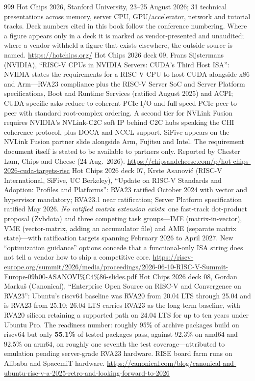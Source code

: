 \begin{thebibliography}{999}
 Hot Chips 2026, Stanford University, 23--25 August 2026; 31 technical presentations across memory, server CPU, GPU/accelerator, network and tutorial tracks. Deck numbers cited in this book follow the conference numbering. Where a figure appears only in a deck it is marked as vendor-presented and unaudited; where a vendor withheld a figure that exists elsewhere, the outside source is named. \url{https://hotchips.org/}
 Hot Chips 2026 deck 09, Frans Sijstermans (NVIDIA), ``RISC-V CPUs in NVIDIA Servers: CUDA's Third Host ISA'': NVIDIA states the requirements for a RISC-V CPU to host CUDA alongside x86 and Arm---RVA23 compliance plus the RISC-V Server SoC and Server Platform specifications, Boot and Runtime Services (ratified August 2025) and ACPI; CUDA-specific asks reduce to coherent PCIe I/O and full-speed PCIe peer-to-peer with standard root-complex ordering. A second tier for NVLink Fusion requires NVIDIA's NVLink-C2C soft IP behind C2C hubs speaking the CHI coherence protocol, plus DOCA and NCCL support. SiFive appears on the NVLink Fusion partner slide alongside Arm, Fujitsu and Intel. The requirement document itself is stated to be available to partners only. Reported by Chester Lam, Chips and Cheese (24 Aug.\ 2026). \url{https://chipsandcheese.com/p/hot-chips-2026-cuda-targets-risc}
 Hot Chips 2026 deck 07, Krste Asanovi\'c (RISC-V International, SiFive, UC Berkeley), ``Update on RISC-V Standards and Adoption: Profiles and Platforms'': RVA23 ratified October 2024 with vector and hypervisor mandatory; RVA23.1 near ratification; Server Platform specification ratified May 2026. \emph{No ratified matrix extension exists}: one fast-track dot-product proposal (Zvbdota) and three competing task groups---IME (matrix-in-vector), VME (vector-matrix, adding an accumulator file) and AME (separate matrix state)---with ratification targets spanning February 2026 to April 2027. New ``optimization guidance'' options concede that a functional-only ISA string does not tell a vendor how to ship a competitive core. \url{https://riscv-europe.org/summit/2026/media/proceedings/2026-06-10-RISC-V-Summit-Europe-09h00-ASANOVI\%C4\%86-slides.pdf}
 Hot Chips 2026 deck 08, Gordan Marku\v{s} (Canonical), ``Enterprise Open Source on RISC-V and Convergence on RVA23'': Ubuntu's riscv64 baseline was RVA20 from 20.04 LTS through 25.04 and is RVA23 from 25.10; 26.04 LTS carries RVA23 as the long-term baseline, with RVA20 silicon retaining a supported path on 24.04 LTS for up to ten years under Ubuntu Pro. The readiness number: roughly 95\% of archive packages build on riscv64 but only \textbf{55.1\%} of tested packages pass, against 92.3\% on amd64 and 92.5\% on arm64, on roughly one seventh the test coverage---attributed to emulation pending server-grade RVA23 hardware. RISE board farm runs on Alibaba and SpacemiT hardware. \url{https://canonical.com/blog/canonical-and-ubuntu-risc-v-a-2025-retro-and-looking-forward-to-2026}

\end{thebibliography}
